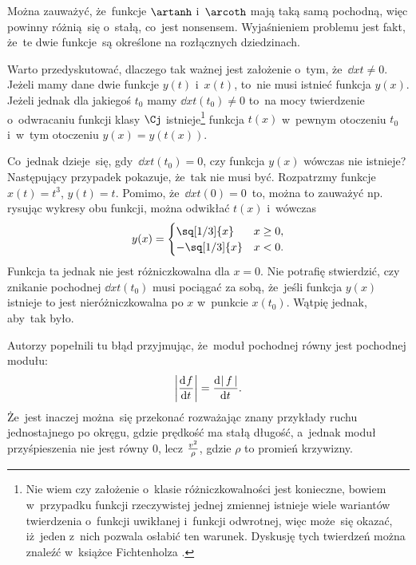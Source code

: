 \documentclass[a4paper,11pt]{article}
\begin{document}
\vspace{\spaceFour}


\start {} Można zauważyć, że~funkcje $\artanh$ i~$\arcoth$ mają
taką samą pochodną, więc powinny różnią~się o~stałą, co~jest
nonsensem. Wyjaśnieniem problemu jest fakt, że~te dwie funkcje~są
określone na rozłącznych dziedzinach.

\vspace{\spaceFour}


\start {} Warto przedyskutować, dlaczego tak ważnej jest
założenie o~tym, że~$\dd{}{ x }{ t } \neq 0$. Jeżeli mamy dane dwie
funkcje $y( t )$ i~$x( t )$, to~nie musi istnieć funkcja $y( x )$.
Jeżeli jednak dla jakiegoś $t_{ 0 }$ mamy
$\dd{}{ x }{ t }( t_{ 0 } ) \neq 0$ to~na mocy twierdzenie
o~odwracaniu funkcji klasy $\Cj$ istnieje\footnote{Nie wiem czy
  założenie o~klasie różniczkowalności jest konieczne, bowiem
  w~przypadku funkcji rzeczywistej jednej zmiennej istnieje wiele
  wariantów twierdzenia o~funkcji uwikłanej i~funkcji odwrotnej, więc
  może~się okazać, iż~jeden z~nich pozwala osłabić ten warunek.
  Dyskusję tych twierdzeń można znaleźć w~książce Fichtenholza
  \cite{Fic05a}.} funkcja $t( x )$ w~pewnym otoczeniu $t_{ 0 }$
i~w~tym otoczeniu $y( x ) = y( t( x ) )$.

Co~jednak dzieje~się, gdy~$\dd{}{ x }{ t }( t_{ 0 } ) = 0$, czy
funkcja $y( x )$ wówczas nie istnieje? Następujący przypadek pokazuje,
że~tak nie musi być. Rozpatrzmy funkcje $x( t ) = t^{ 3 }$,
$y( t ) = t$. Pomimo, że~$\dd{}{ x }{ t }( 0 ) = 0$~to, można to
zauważyć np. rysując wykresy obu funkcji, można odwikłać $t( x )$
i~wówczas
\begin{displaymath}
  y( x ) =
  \begin{cases}
    \sq[1 / 3]{ x } & x \geq 0, \\
    -\sq[1 / 3]{ x } & x < 0.
  \end{cases}
\end{displaymath}
Funkcja ta jednak nie jest różniczkowalna dla $x = 0$. Nie potrafię
stwierdzić, czy znikanie pochodnej $\dd{}{ x }{ t }( t_{ 0 } )$ musi
pociągać za sobą, że~jeśli funkcja $y( x )$ istnieje to jest
nieróżniczkowalna po $x$ w~punkcie $x( t_{ 0 } )$. Wątpię jednak,
aby~tak było.

\vspace{\spaceFour}


\start {} Autorzy popełnili tu błąd przyjmując, że~moduł
pochodnej równy jest pochodnej modułu:
\begin{displaymath}
  \left| \frac{ \mathrm{d}^{  } {  f  } }{ \mathrm{d} {  t  }^{  } } \right| = \frac{ \mathrm{d}^{  } {  \left| \,  f  \, \right|  } }{ \mathrm{d} {  t  }^{  } }.
\end{displaymath}
Że~jest inaczej można~się przekonać rozważając znany przykłady ruchu
jednostajnego po okręgu, gdzie prędkość ma stałą długość, a~jednak
moduł przyśpieszenia nie jest równy 0, lecz $\frac{ v^{ 2 } }{ \rho }$,
gdzie $\rho$ to promień krzywizny.
\end{document}
